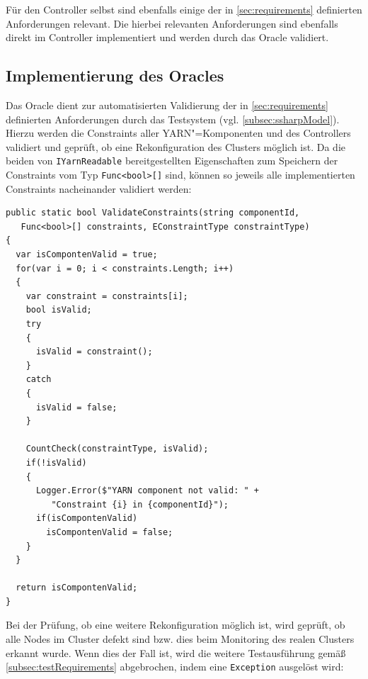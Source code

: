 Für den Controller selbst sind ebenfalls einige der in \cref{sec:requirements} definierten Anforderungen relevant.
Die hierbei relevanten Anforderungen sind ebenfalls direkt im Controller implementiert und werden durch das Oracle validiert.

\subsection{Implementierung des Oracles}
\label{subsec:oracleImpl}

Das Oracle dient zur automatisierten Validierung der in \cref{sec:requirements} definierten Anforderungen durch das Testsystem (vgl. \cref{subsec:ssharpModel}).
Hierzu werden die Constraints aller YARN"=Komponenten und des Controllers validiert und geprüft, ob eine Rekonfiguration des Clusters möglich ist.
Da die beiden von \texttt{IYarnReadable} bereitgestellten Eigenschaften zum Speichern der Constraints vom Typ \texttt{Func<bool>[]} sind, können so jeweils alle implementierten Constraints nacheinander validiert werden:

\begin{lstlisting}[label=lst:oracleValidateConstraints,style=cs,
caption={[Validieren der Constraints durch das Oracle]
    Validieren der Constraints durch das Oracle.
    Die zu validierenden Constraints werden im Parameter \texttt{constraints} übergeben, der Parameter \texttt{constraintType} dient zu statistischen Zwecken in \texttt{CountCheck()}.}]
public static bool ValidateConstraints(string componentId,
   Func<bool>[] constraints, EConstraintType constraintType)
{
  var isCompontenValid = true;
  for(var i = 0; i < constraints.Length; i++)
  {
    var constraint = constraints[i];
    bool isValid;
    try
    {
      isValid = constraint();
    }
    catch
    {
      isValid = false;
    }
    
    CountCheck(constraintType, isValid);
    if(!isValid)
    {
      Logger.Error($"YARN component not valid: " +
         "Constraint {i} in {componentId}");
      if(isCompontenValid)
        isCompontenValid = false;
    }
  }
  
  return isCompontenValid;
}
\end{lstlisting}

Bei der Prüfung, ob eine weitere Rekonfiguration möglich ist, wird geprüft, ob alle Nodes im Cluster defekt sind bzw. dies beim Monitoring des realen Clusters erkannt wurde.
Wenn dies der Fall ist, wird die weitere Testausführung gemäß \cref{subsec:testRequirements} abgebrochen, indem eine \texttt{Exception} ausgelöst wird:


